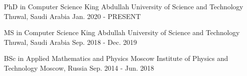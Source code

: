 


\begin{cventries}


\cventry
{PhD in Computer Science } %
{King Abdullah University of Science and Technology} %
{Thuwal, Saudi Arabia} %
{Jan. 2020 - PRESENT} %
{
}

\cventry
{MS in Computer Science } %
{King Abdullah University of Science and Technology} %
{Thuwal, Saudi Arabia} %
{Sep. 2018 - Dec. 2019} %
{
}

\cventry
{BSc in Applied Mathematics and Physics} %
{Moscow Institute of Physics and Technology} %
{Moscow, Russia} %
{Sep. 2014 - Jun. 2018} %
{ %
}


\end{cventries}